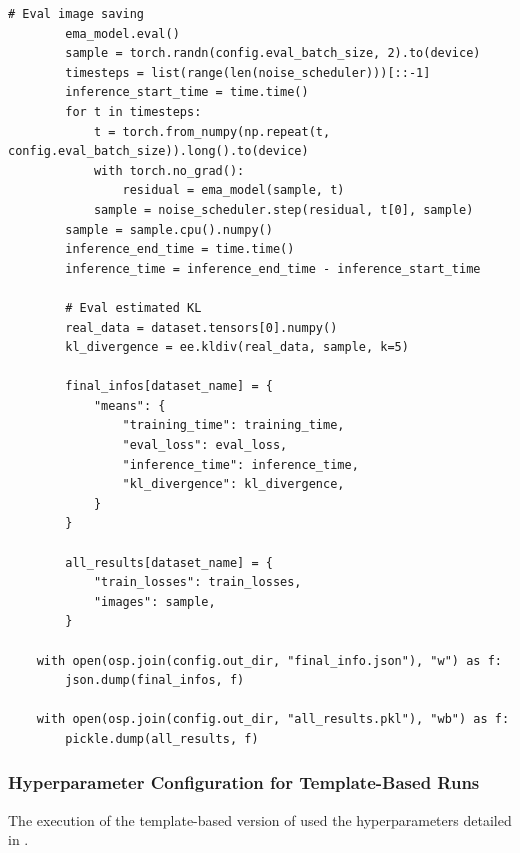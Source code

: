 \begin{appendices}
\begin{tcolorbox}[breakable,colback=orange!5!white, colframe=orange!80!black, title=Generalized Idea Generation System and User Prompt]
\begin{Verbatim}[breaklines, breaksymbol={}, breaksymbolleft={}, fontsize=\small]
        # Eval image saving
        ema_model.eval()
        sample = torch.randn(config.eval_batch_size, 2).to(device)
        timesteps = list(range(len(noise_scheduler)))[::-1]
        inference_start_time = time.time()
        for t in timesteps:
            t = torch.from_numpy(np.repeat(t, config.eval_batch_size)).long().to(device)
            with torch.no_grad():
                residual = ema_model(sample, t)
            sample = noise_scheduler.step(residual, t[0], sample)
        sample = sample.cpu().numpy()
        inference_end_time = time.time()
        inference_time = inference_end_time - inference_start_time

        # Eval estimated KL
        real_data = dataset.tensors[0].numpy()
        kl_divergence = ee.kldiv(real_data, sample, k=5)

        final_infos[dataset_name] = {
            "means": {
                "training_time": training_time,
                "eval_loss": eval_loss,
                "inference_time": inference_time,
                "kl_divergence": kl_divergence,
            }
        }

        all_results[dataset_name] = {
            "train_losses": train_losses,
            "images": sample,
        }

    with open(osp.join(config.out_dir, "final_info.json"), "w") as f:
        json.dump(final_infos, f)

    with open(osp.join(config.out_dir, "all_results.pkl"), "wb") as f:
        pickle.dump(all_results, f)
\end{Verbatim}
\end{tcolorbox}


\subsubsection{Hyperparameter Configuration for Template-Based Runs}
\label{app:v1_hyperparams}
The execution of the template-based version of \ouralgo used the hyperparameters detailed in .


\end{appendices}
